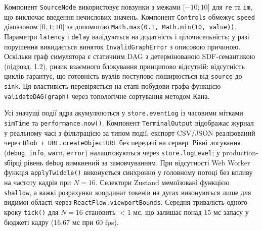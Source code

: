 \documentclass[
]{article}
\newcommand{\passthrough}[1]{#1}
\begin{document}
Компонент \passthrough{\lstinline!SourceNode!} використовує повзунки з
межами \(\lbrack - 10;10\rbrack\) для \passthrough{\lstinline!re!} та
\passthrough{\lstinline!im!}, що виключає введення нечислових значень.
Компонент \passthrough{\lstinline!Controls!} обмежує
\passthrough{\lstinline!speed!} діапазоном \(\lbrack 0,1;10\rbrack\) за
допомогою
\passthrough{\lstinline!Math!}\passthrough{\lstinline!.!}\passthrough{\lstinline!max!}\passthrough{\lstinline!(0.1,!}\passthrough{\lstinline! !}\passthrough{\lstinline!Math!}\passthrough{\lstinline!.!}\passthrough{\lstinline!min!}\passthrough{\lstinline!(10,!}\passthrough{\lstinline! !}\passthrough{\lstinline!value!}\passthrough{\lstinline!))!}.
Параметри \passthrough{\lstinline!latency!} і
\passthrough{\lstinline!delay!} валідуються на додатність і
цілочисельність; у разі порушення викидається виняток
\passthrough{\lstinline!InvalidGraphError!} з описовою причиною.
Оскільки граф симулятора є статичним DAG з детермінованою SDF-семантикою
(підрозд. 1.2), ризик взаємного блокування принципово відсутній:
відсутність циклів гарантує, що готовність вузлів поступово поширюється
від \passthrough{\lstinline!source!} до \passthrough{\lstinline!sink!}.
Ця властивість перевіряється на етапі побудови графа функцією
\passthrough{\lstinline!validateDAG!}\passthrough{\lstinline!(!}\passthrough{\lstinline!graph!}\passthrough{\lstinline!)!}
через топологічне сортування методом Кана.

Усі значущі події ядра акумулюються у
\passthrough{\lstinline!store!}\passthrough{\lstinline!.!}\passthrough{\lstinline!eventLog!}
із часовими мітками \passthrough{\lstinline!simTime!} та
\passthrough{\lstinline!performance!}\passthrough{\lstinline!.!}\passthrough{\lstinline!now!}\passthrough{\lstinline!()!}.
Компонент \passthrough{\lstinline!TerminalOutput!} відображає журнал у
реальному часі з фільтрацією за типом події; експорт CSV/JSON
реалізований через
\passthrough{\lstinline!Blob!}\passthrough{\lstinline! !}\passthrough{\lstinline!+!}\passthrough{\lstinline! !}\passthrough{\lstinline!URL!}\passthrough{\lstinline!.!}\passthrough{\lstinline!createObjectURL!}
без передачі на сервер. Рівні логування
(\passthrough{\lstinline!debug!}, \passthrough{\lstinline!info!},
\passthrough{\lstinline!warn!}, \passthrough{\lstinline!error!})
налаштовуються через
\passthrough{\lstinline!store!}\passthrough{\lstinline!.!}\passthrough{\lstinline!logLevel!};
у production-збірці рівень \passthrough{\lstinline!debug!} вимкнений за
замовчуванням. При відсутності Web Worker функція
\passthrough{\lstinline!applyTwiddle!}\passthrough{\lstinline!()!}
виконується синхронно у головному потоці без впливу на частоту кадрів
при \(N = 16\). Селектори Zustand мемоїзовані функцією
\passthrough{\lstinline!shallow!}, а важкі розрахунки координат токенів
на дугах виконуються лише для видимої області через
\passthrough{\lstinline!ReactFlow!}\passthrough{\lstinline!.!}\passthrough{\lstinline!viewportBounds!}.
Середня тривалість одного кроку
\passthrough{\lstinline!tick!}\passthrough{\lstinline!()!} для
\(N = 16\) становить \(< 1\) мс, що залишає понад 15 мс запасу у бюджеті
кадру (16,67 мс при 60 fps).
\end{document}
